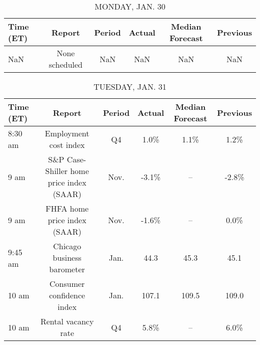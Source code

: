 \documentclass{article}%
\begin{document}
%
\normalsize%


\begin{table}[htbp]%
\caption{MONDAY, JAN. 30}%
\centering%
\begin{adjustbox}{width=1\textwidth}%
\begin{tabular}{lccccc}
\toprule
Time (ET) &         Report & Period & Actual & Median Forecast & Previous \\
\midrule
      NaN & None scheduled &    NaN &    NaN &             NaN &      NaN \\
\bottomrule
\end{tabular}
%
\end{adjustbox}%
\end{table}

%


\begin{table}[htbp]%
\caption{TUESDAY, JAN. 31}%
\centering%
\begin{adjustbox}{width=1\textwidth}%
\begin{tabular}{lccccc}
\toprule
Time (ET) &                                   Report & Period & Actual & Median Forecast & Previous \\
\midrule
  8:30 am &                    Employment cost index &     Q4 &   1.0\% &            1.1\% &     1.2\% \\
     9 am & S\&P Case-Shiller home price index (SAAR) &   Nov. &  -3.1\% &              -- &    -2.8\% \\
     9 am &             FHFA home price index (SAAR) &   Nov. &  -1.6\% &              -- &     0.0\% \\
  9:45 am &               Chicago business barometer &   Jan. &   44.3 &            45.3 &     45.1 \\
    10 am &                Consumer confidence index &   Jan. &  107.1 &           109.5 &    109.0 \\
    10 am &                      Rental vacancy rate &     Q4 &   5.8\% &              -- &     6.0\% \\
\bottomrule
\end{tabular}
%
\end{adjustbox}%
\end{table}

%
\end{document}
